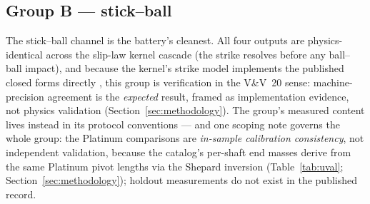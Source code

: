 \subsection{Group B --- stick--ball}
\label{sec:results-b}


The stick--ball channel is the battery's cleanest. All four outputs are
physics-identical across the slip-law kernel cascade (the strike resolves
before any ball--ball impact), and because the kernel's strike model
implements the published closed forms directly
\citep{alciatore_tp_a31,cross2008squirt,shepard2001squirt,
coriolis1835,alciatore2008coriolis}, this group is verification in the
V\&V~20 sense: machine-precision agreement is the \emph{expected}
result, framed as implementation evidence, not physics validation
(Section~\ref{sec:methodology}). The group's measured content lives
instead in its protocol conventions --- and one scoping note governs the
whole group: the Platinum comparisons are \emph{in-sample calibration
consistency}, not independent validation, because the catalog's
per-shaft end masses derive from the same Platinum pivot lengths via
the Shepard inversion (Table~\ref{tab:uval};
Section~\ref{sec:methodology}); holdout measurements do not exist in
the published record.

